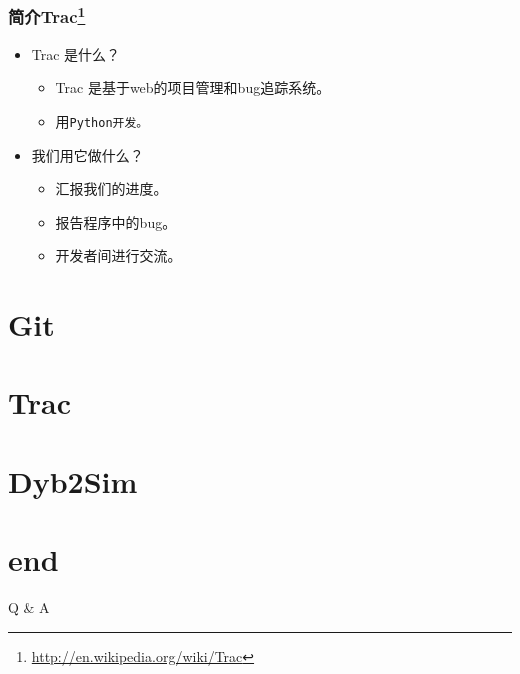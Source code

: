 \documentclass[20pt]{beamer}
\begin{document}
\begin{frame}
    \frametitle{简介Trac\footnote{\url{http://en.wikipedia.org/wiki/Trac}}}
    \begin{itemize}    
        \item Trac 是什么？
            \begin{itemize}
                \item Trac 是基于web的项目管理和bug追踪系统。
                \item 用\tt{Python}开发。
            \end{itemize}
        \item 我们用它做什么？
            \begin{itemize}
                \item 汇报我们的进度。
                \item 报告程序中的bug。
                \item 开发者间进行交流。
            \end{itemize}
    \end{itemize}
\end{frame}

\section{Git}

    

\section{Trac}

    

\section{Dyb2Sim}

    

\section*{end}
\begin{frame}
    \begin{center}
        \LARGE Q \& A
    \end{center}
\end{frame}
\end{document}
